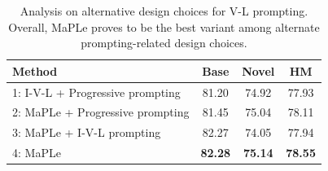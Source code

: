 \documentclass[10pt,twocolumn,letterpaper]{article}
\newcommand{\tablestyle}[2]{\setlength{\tabcolsep}{#1}\renewcommand{\arraystretch}{#2}\centering\footnotesize}
\begin{document}
\begin{table}[h!]
\tablestyle{6pt}{1.1}
\addtolength{\tabcolsep}{-4.5pt}
\centering
\begin{tabular}{l ccc}
\toprule
Method  & Base & Novel & HM\\
\midrule
1: I-V-L + Progressive prompting &	81.20 & 74.92 &	77.93\\
2: MaPLe + Progressive prompting & 81.45 & 75.04 & 78.11\\
3: MaPLe + I-V-L prompting & 82.27 & 74.05 & 77.94\\
\midrule
\rowcolor{tabhighlight}
4: MaPLe  &	\textbf{82.28} &	\textbf{75.14} &	\textbf{78.55}\\
\bottomrule
\end{tabular}
\caption{
Analysis on alternative design choices for V-L prompting. Overall, MaPLe proves to be the best variant among alternate prompting-related design choices.  
} 
\label{table:other_design_variants_ablation}
\end{table}





\label{appendix:additional_analysis}
\end{document}
